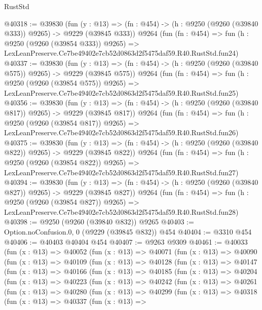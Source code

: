 \begin{lexlean}{RustStd}
\begin{coremodule}
@40318 := @39830
    (fun (y : @13) => (fn : @454) -> (h : @9250 (@9260 (@39840 @333)) @9265) -> @9229 (@39845 @333))
    @9264
    (fun (fn : @454) =>
    fun (h : @9250 (@9260 (@39854 @333)) @9265) =>
    LexLeanPreserve.Ce7be49402e7cb52d0863d2f5475daf59.R40.RustStd.fun24)
@40337 := @39830
    (fun (y : @13) => (fn : @454) -> (h : @9250 (@9260 (@39840 @575)) @9265) -> @9229 (@39845 @575))
    @9264
    (fun (fn : @454) =>
    fun (h : @9250 (@9260 (@39854 @575)) @9265) =>
    LexLeanPreserve.Ce7be49402e7cb52d0863d2f5475daf59.R40.RustStd.fun25)
@40356 := @39830
    (fun (y : @13) => (fn : @454) -> (h : @9250 (@9260 (@39840 @817)) @9265) -> @9229 (@39845 @817))
    @9264
    (fun (fn : @454) =>
    fun (h : @9250 (@9260 (@39854 @817)) @9265) =>
    LexLeanPreserve.Ce7be49402e7cb52d0863d2f5475daf59.R40.RustStd.fun26)
@40375 := @39830
    (fun (y : @13) => (fn : @454) -> (h : @9250 (@9260 (@39840 @822)) @9265) -> @9229 (@39845 @822))
    @9264
    (fun (fn : @454) =>
    fun (h : @9250 (@9260 (@39854 @822)) @9265) =>
    LexLeanPreserve.Ce7be49402e7cb52d0863d2f5475daf59.R40.RustStd.fun27)
@40394 := @39830
    (fun (y : @13) => (fn : @454) -> (h : @9250 (@9260 (@39840 @827)) @9265) -> @9229 (@39845 @827))
    @9264
    (fun (fn : @454) =>
    fun (h : @9250 (@9260 (@39854 @827)) @9265) =>
    LexLeanPreserve.Ce7be49402e7cb52d0863d2f5475daf59.R40.RustStd.fun28)
@40398 := @9250 (@9260 (@39840 @832)) @9265
@40403 := Option.noConfusion.{0, 0} (@9229 (@39845 @832)) @454
@40404 := @3310 @454
@40406 := @40403 @40404 @454
@40407 := @9263 @9309
@40461 := @40033
    (fun (x : @13) =>
    @40052
      (fun (x : @13) =>
      @40071
        (fun (x : @13) =>
        @40090
          (fun (x : @13) =>
          @40109
            (fun (x : @13) =>
            @40128
              (fun (x : @13) =>
              @40147
                (fun (x : @13) =>
                @40166
                  (fun (x : @13) =>
                  @40185
                    (fun (x : @13) =>
                    @40204
                      (fun (x : @13) =>
                      @40223
                        (fun (x : @13) =>
                        @40242
                          (fun (x : @13) =>
                          @40261
                            (fun (x : @13) =>
                            @40280
                              (fun (x : @13) =>
                              @40299
                                (fun (x : @13) =>
                                @40318
                                  (fun (x : @13) =>
                                  @40337
                                    (fun (x : @13) =>

\end{coremodule}
\end{lexlean}

